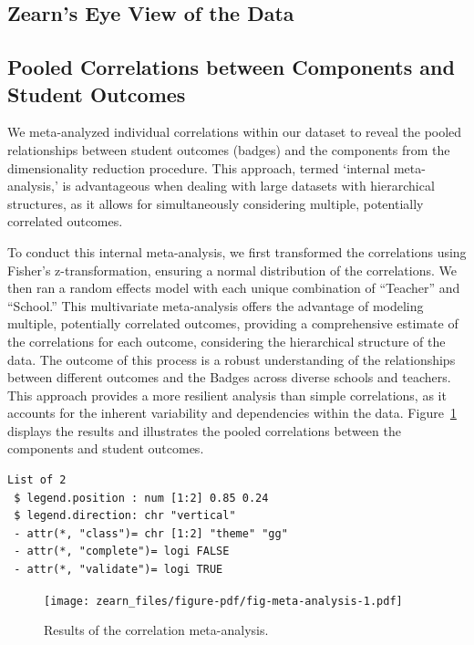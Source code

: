 \documentclass[
  number,
  preprint,
  3p,
  onecolumn]{elsarticle}
\begin{document}
\hypertarget{zearns-eye-view-of-the-data}{%
\subsection{Zearn's Eye View of the
Data}\label{zearns-eye-view-of-the-data}}

\hypertarget{pooled-correlations-between-components-and-student-outcomes}{%
\subsection{Pooled Correlations between Components and Student
Outcomes}\label{pooled-correlations-between-components-and-student-outcomes}}

We meta-analyzed individual correlations within our dataset to reveal
the pooled relationships between student outcomes (badges) and the
components from the dimensionality reduction procedure. This approach,
termed `internal meta-analysis,' is advantageous when dealing with large
datasets with hierarchical structures, as it allows for simultaneously
considering multiple, potentially correlated outcomes.

To conduct this internal meta-analysis, we first transformed the
correlations using Fisher's z-transformation, ensuring a normal
distribution of the correlations. We then ran a random effects model
with each unique combination of ``Teacher'' and ``School.'' This
multivariate meta-analysis offers the advantage of modeling multiple,
potentially correlated outcomes, providing a comprehensive estimate of
the correlations for each outcome, considering the hierarchical
structure of the data. The outcome of this process is a robust
understanding of the relationships between different outcomes and the
Badges across diverse schools and teachers. This approach provides a
more resilient analysis than simple correlations, as it accounts for the
inherent variability and dependencies within the data.
Figure~\ref{fig-meta-analysis} displays the results and illustrates the
pooled correlations between the components and student outcomes.

\begin{verbatim}
List of 2
 $ legend.position : num [1:2] 0.85 0.24
 $ legend.direction: chr "vertical"
 - attr(*, "class")= chr [1:2] "theme" "gg"
 - attr(*, "complete")= logi FALSE
 - attr(*, "validate")= logi TRUE
\end{verbatim}

\begin{figure}

{\centering \texttt{[image: zearn\_files/figure-pdf/fig-meta-analysis-1.pdf]}

}

\caption{\label{fig-meta-analysis}Results of the correlation
meta-analysis.}

\end{figure}
\end{document}
